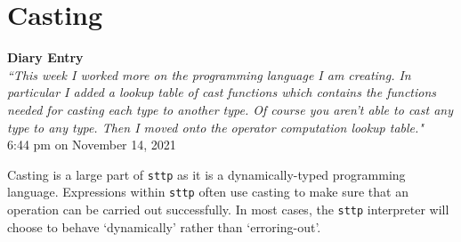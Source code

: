 \section{Casting}

\begin{center}
    \textbf{Diary Entry}\\[0.5em]
    \textit{``This week I worked more on the programming language I am creating. In particular I added a lookup table of cast functions which contains the functions needed for casting each type to another type. Of course you aren’t able to cast any type to any type. Then I moved onto the operator computation lookup table."}\\[0.5em]
    \tiny{6:44 pm on November 14, 2021}
\end{center}

Casting is a large part of \verb|sttp| as it is a dynamically-typed programming language. Expressions within \verb|sttp| often use casting to make sure that an operation can be carried out successfully. In most cases, the \verb|sttp| interpreter will choose to behave `dynamically' rather than `erroring-out'.
